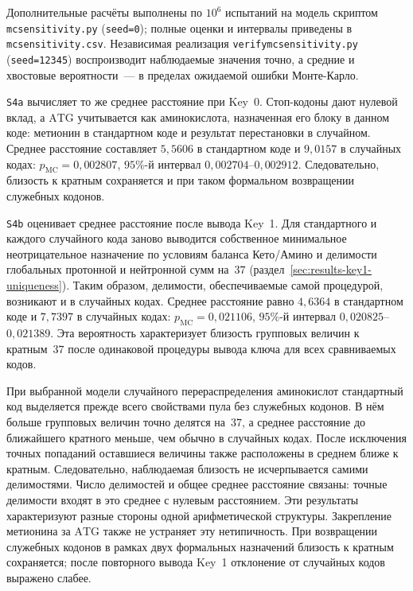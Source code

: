 \documentclass[11pt,a4paper]{article}
\renewcommand{\_}{\origunderscore\allowbreak}
\begin{document}
Дополнительные расчёты выполнены по $10^{6}$ испытаний на модель
скриптом \texttt{mc\_sensitivity.py} (\texttt{seed=0});
полные оценки и интервалы приведены в \texttt{mc\_sensitivity.csv}.
Независимая реализация \texttt{verify\_mc\_sensitivity.py}
(\texttt{seed=12345}) воспроизводит наблюдаемые значения точно,
а средние и хвостовые вероятности~--- в пределах ожидаемой
ошибки Монте-Карло.

\texttt{S4a} вычисляет то же среднее расстояние при Key~0.
Стоп-кодоны дают нулевой вклад, а $\mathrm{ATG}$ учитывается
как аминокислота, назначенная его блоку в данном коде:
метионин в стандартном коде и результат перестановки в случайном.
Среднее расстояние составляет $5{,}5606$ в стандартном коде
и $9{,}0157$ в случайных кодах:
$p_{\mathrm{MC}} = 0{,}002807$,
$95\%$-й интервал $0{,}002704$--$0{,}002912$.
Следовательно, близость к кратным сохраняется и при таком
формальном возвращении служебных кодонов.

\texttt{S4b} оценивает среднее расстояние после вывода Key~1.
Для стандартного и каждого случайного кода заново выводится
собственное минимальное неотрицательное назначение по условиям
баланса Кето/Амино и делимости глобальных протонной и нейтронной
сумм на~$37$ (раздел~\ref{sec:results-key1-uniqueness}).
Таким образом, делимости, обеспечиваемые самой процедурой,
возникают и в случайных кодах. Среднее расстояние равно
$4{,}6364$ в стандартном коде и $7{,}7397$ в случайных кодах:
$p_{\mathrm{MC}} = 0{,}021106$,
$95\%$-й интервал $0{,}020825$--$0{,}021389$.
Эта вероятность характеризует близость групповых величин
к кратным~$37$ после одинаковой процедуры вывода ключа
для всех сравниваемых кодов.

При выбранной модели случайного перераспределения аминокислот
стандартный код выделяется прежде всего свойствами пула без
служебных кодонов. В нём больше групповых величин точно делятся
на~$37$, а среднее расстояние до ближайшего кратного меньше,
чем обычно в случайных кодах. После исключения точных попаданий
оставшиеся величины также расположены в среднем ближе к кратным.
Следовательно, наблюдаемая близость не исчерпывается самими
делимостями. Число делимостей и общее среднее расстояние связаны:
точные делимости входят в это среднее с нулевым расстоянием.
Эти результаты характеризуют разные стороны одной арифметической
структуры. Закрепление метионина за $\mathrm{ATG}$ также
не устраняет эту нетипичность. При возвращении служебных кодонов в рамках двух
формальных назначений близость к кратным сохраняется; после
повторного вывода Key~1 отклонение от случайных кодов выражено слабее.
\end{document}
